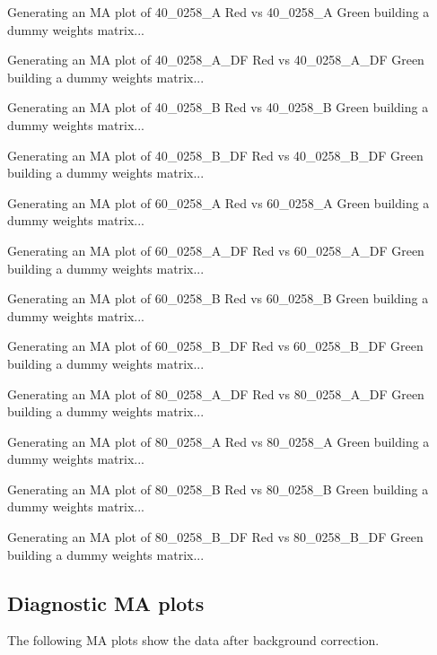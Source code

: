 \documentclass[titlepage]{article}
\begin{document}
\begin{Schunk}
\begin{Soutput}
Generating an MA plot of  40_0258_A Red vs 40_0258_A Green 
building a dummy weights matrix... 

Generating an MA plot of  40_0258_A_DF Red vs 40_0258_A_DF Green 
building a dummy weights matrix... 

Generating an MA plot of  40_0258_B Red vs 40_0258_B Green 
building a dummy weights matrix... 

Generating an MA plot of  40_0258_B_DF Red vs 40_0258_B_DF Green 
building a dummy weights matrix... 

Generating an MA plot of  60_0258_A Red vs 60_0258_A Green 
building a dummy weights matrix... 

Generating an MA plot of  60_0258_A_DF Red vs 60_0258_A_DF Green 
building a dummy weights matrix... 

Generating an MA plot of  60_0258_B Red vs 60_0258_B Green 
building a dummy weights matrix... 

Generating an MA plot of  60_0258_B_DF Red vs 60_0258_B_DF Green 
building a dummy weights matrix... 

Generating an MA plot of  80_0258_A_DF Red vs 80_0258_A_DF Green 
building a dummy weights matrix... 

Generating an MA plot of  80_0258_A Red vs 80_0258_A Green 
building a dummy weights matrix... 

Generating an MA plot of  80_0258_B Red vs 80_0258_B Green 
building a dummy weights matrix... 

Generating an MA plot of  80_0258_B_DF Red vs 80_0258_B_DF Green 
building a dummy weights matrix... 
\end{Soutput}
\end{Schunk}
\pagebreak
\subsection{Diagnostic MA plots}
The following MA plots show the data after background correction.
\end{document}
